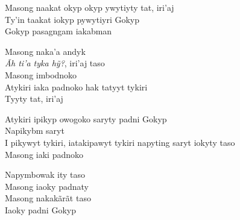 \smallskip
\begin{center}\end{center}
\smallskip

\noindent Masong naakat okyp okyp ywytiyty tat, iri'aj\\
Ty'in taakat iokyp pywytiyri Gokyp\\
Gokyp pasagngam iakabman

\smallskip
\begin{center}\end{center}
\smallskip

\noindent Masong naka'a andyk\\
\textit{Ãh ti'a tyka hỹ?}, iri'aj taso\\
Masong imbodnoko\\
Atykiri iaka padnoko hak tatyyt tykiri\\
Tyyty tat, iri'aj

\smallskip
\begin{center}\end{center}
\smallskip

\noindent Atykiri ipikyp owogoko saryty padni Gokyp\\
Napikybm saryt\\
I pikywyt tykiri, iatakipawyt tykiri napyting saryt iokyty taso\\
Masong iaki padnoko

\smallskip
\begin{center}\end{center}
\smallskip

\noindent Napymbowak ity taso\\
Masong iaoky padnaty\\
Masong nakakãrãt taso\\
Iaoky padni Gokyp

